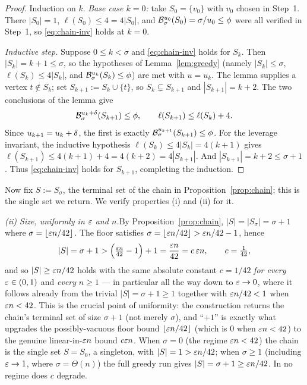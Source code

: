 \begin{proof}
Induction on $k$. \emph{Base case $k=0$:} take $S_0=\{v_0\}$ with $v_0$ chosen in
Step~1. There $|S_0|=1$, $\ell(S_0)\le4=4|S_0|$, and
$\mathcal{B}^{u_0}_{\sigma}(S_0)=\sigma/u_0\le\phi$ were all verified in Step~1, so
\eqref{eq:chain-inv} holds at $k=0$.

\emph{Inductive step.} Suppose $0\le k<\sigma$ and \eqref{eq:chain-inv} holds for
$S_k$. Then $|S_k|=k+1\le\sigma$, so the hypotheses of Lemma~\ref{lem:greedy}
(namely $|S_k|\le\sigma$, $\ell(S_k)\le4|S_k|$, and
$\mathcal{B}^{u_k}_{\sigma}(S_k)\le\phi$) are met with $u=u_k$. The lemma supplies a
vertex $t\notin S_k$; set $S_{k+1}:=S_k\cup\{t\}$, so $S_k\subsetneq S_{k+1}$ and
$|S_{k+1}|=k+2$. The two conclusions of the lemma give
\[
  \mathcal{B}^{u_k+\delta}_{\sigma}(S_{k+1})\le\phi,
  \qquad
  \ell(S_{k+1})\le\ell(S_k)+4 .
\]
Since $u_{k+1}=u_k+\delta$, the first is exactly
$\mathcal{B}^{u_{k+1}}_{\sigma}(S_{k+1})\le\phi$. For the leverage invariant, the
inductive hypothesis $\ell(S_k)\le4|S_k|=4(k+1)$ gives
$\ell(S_{k+1})\le4(k+1)+4=4(k+2)=4|S_{k+1}|$. And $|S_{k+1}|=k+2\le\sigma+1$.
Thus \eqref{eq:chain-inv} holds for $S_{k+1}$, completing the induction.
\end{proof}

Now fix $S:=S_\sigma$, the terminal set of the chain in
Proposition~\ref{prop:chain}; this is the single set we return. We verify
properties (i) and (ii) for it.

\medskip\noindent\emph{(ii) Size, uniformly in $\varepsilon$ and $n$.}\quad By
Proposition~\ref{prop:chain}, $|S|=|S_\sigma|=\sigma+1$ where
$\sigma=\lfloor\varepsilon n/42\rfloor$. The floor satisfies
$\sigma=\lfloor\varepsilon n/42\rfloor>\varepsilon n/42-1$, hence
\[
  |S|=\sigma+1>\Bigl(\tfrac{\varepsilon n}{42}-1\Bigr)+1=\frac{\varepsilon n}{42}
      =c\,\varepsilon n,\qquad c=\tfrac{1}{42},
\]
and so $|S|\ge \varepsilon n/42$ holds with the same absolute constant $c=1/42$
\emph{for every} $\varepsilon\in(0,1)$ and \emph{every} $n\ge1$ --- in particular all
the way down to $\varepsilon\to0$, where it follows already from the trivial
$|S|=\sigma+1\ge1$ together with $\varepsilon n/42<1$ when $\varepsilon n<42$. This is the
crucial point of uniformity: the construction returns the chain's terminal set of
size $\sigma+1$ (not merely $\sigma$), and ``$+1$'' is exactly what upgrades the
possibly-vacuous floor bound $\lfloor\varepsilon n/42\rfloor$ (which is $0$ when
$\varepsilon n<42$) to the genuine linear-in-$\varepsilon n$ bound $c\varepsilon n$. When
$\sigma=0$ (the regime $\varepsilon n<42$) the chain is the single set $S=S_0$, a
singleton, with $|S|=1>\varepsilon n/42$; when $\sigma\ge1$ (including $\varepsilon\to1$,
where $\sigma=\Theta(n)$) the full greedy run gives $|S|=\sigma+1\ge\varepsilon n/42$.
In no regime does $c$ degrade.

